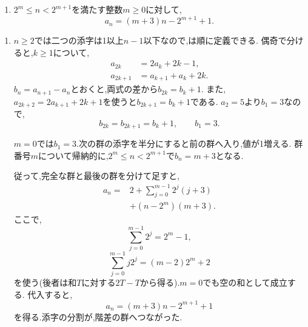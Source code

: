 \noindent {}\par\nobreak
\begin{enumerate}[label=(\arabic*),parsep=3pt,beginpenalty=10000,format=\bookitemlink{example-gauss-role-7}{answer}{problem}]
  \item $2^m\le n<2^{m+1}$を満たす整数$m\ge0$に対して,
    \[
      a_n=(m+3)n-2^{m+1}+1.
    \]
\end{enumerate}

\noindent {}\par\nobreak
\begin{enumerate}[label=(\arabic*),parsep=3pt,beginpenalty=10000,format=\bookitemlink{example-gauss-role-7}{solution}{problem}]
  \item $n\ge2$では二つの添字は1以上$n-1$以下なので,は順に定義できる.
    偶奇で分けると,$k\ge1$について,
    \[
      \begin{aligned}
        a_{2k}&=2a_k+2k-1,\\
        a_{2k+1}&=a_{k+1}+a_k+2k.
      \end{aligned}
    \]
    $b_n=a_{n+1}-a_n$とおくと,両式の差から$b_{2k}=b_k+1$.
    また,$a_{2k+2}=2a_{k+1}+2k+1$を使うと$b_{2k+1}=b_k+1$である.
    $a_2=5$より$b_1=3$なので,
    \[
      b_{2k}=b_{2k+1}=b_k+1,\qquad b_1=3.
    \]

    $m=0$では$b_1=3$.次の群の添字を半分にすると前の群へ入り,値が1増える.
    群番号$m$について帰納的に,$2^m\le n<2^{m+1}$で$b_n=m+3$となる.

    従って,完全な群と最後の群を分けて足すと,
    \begin{align*}
      a_n={}&2+\sum_{j=0}^{m-1}2^j(j+3)\\
      &+(n-2^m)(m+3).
    \end{align*}
    ここで,
    \[
      \sum_{j=0}^{m-1}2^j=2^m-1,
    \]
    \[
      \sum_{j=0}^{m-1}j2^j=(m-2)2^m+2
    \]
    を使う(後者は和$T$に対する$2T-T$から得る).$m=0$でも空の和として成立する.
    代入すると,
    \[
      a_n=(m+3)n-2^{m+1}+1
    \]
    を得る.添字の分割が,階差の群へつながった.
\end{enumerate}
